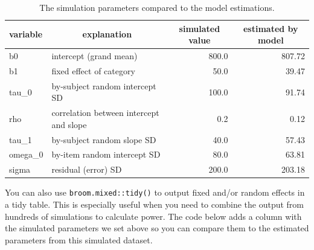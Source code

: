 \documentclass[
  english,
  doc,floatsintext]{apa6}
\newenvironment{Shaded}{\begin{snugshade}}{\end{snugshade}}
\newcommand{\CommentTok}[1]{\textcolor[rgb]{0.56,0.35,0.01}{\textit{#1}}}
\newcommand{\DataTypeTok}[1]{\textcolor[rgb]{0.13,0.29,0.53}{#1}}
\newcommand{\DecValTok}[1]{\textcolor[rgb]{0.00,0.00,0.81}{#1}}
\newcommand{\KeywordTok}[1]{\textcolor[rgb]{0.13,0.29,0.53}{\textbf{#1}}}
\newcommand{\NormalTok}[1]{#1}
\newcommand{\OperatorTok}[1]{\textcolor[rgb]{0.81,0.36,0.00}{\textbf{#1}}}
\newcommand{\StringTok}[1]{\textcolor[rgb]{0.31,0.60,0.02}{#1}}
\begin{document}
\begin{table}[H]

\begin{center}
\begin{threeparttable}

\caption{\label{tab:param-compare}The simulation parameters compared to the model estimations.}

\begin{tabular}{llrr}
\toprule
variable & \multicolumn{1}{c}{explanation} & \multicolumn{1}{c}{simulated value} & \multicolumn{1}{c}{estimated by model}\\
\midrule
b0 & intercept (grand mean) & 800.0 & 807.72\\
b1 & fixed effect of category & 50.0 & 39.47\\
tau\_0 & by-subject random intercept SD & 100.0 & 91.74\\
rho & correlation between intercept and slope & 0.2 & 0.12\\
tau\_1 & by-subject random slope SD & 40.0 & 57.43\\
omega\_0 & by-item random intercept SD & 80.0 & 63.81\\
sigma & residual (error) SD & 200.0 & 203.18\\
\bottomrule
\end{tabular}

\end{threeparttable}
\end{center}

\end{table}

You can also use \texttt{broom.mixed::tidy()} to output fixed and/or random effects in a tidy table. This is especially useful when you need to combine the output from hundreds of simulations to calculate power. The code below adds a column with the simulated parameters we set above so you can compare them to the estimated parameters from this simulated dataset.

\begin{Shaded}
\end{Shaded}
\end{document}
